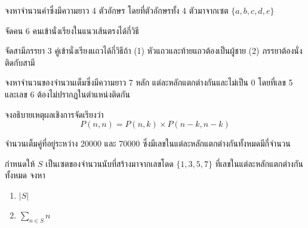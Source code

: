 

\begin{exam}
	จงหาจำนวนคำซึ่งมีความยาว 4 ตัวอักษร โดยที่ตัวอักษรทั้ง 4 ตัวมาจากเซต $ \{a,b,c,d,e\} $
\end{exam}
\begin{exam}
	จัดคน 6 คนเข้านั่งเรียงในแนวเส้นตรงได้กี่วิธี
\end{exam}
\begin{exam}
	จัดสามีภรรยา 3 คู่เข้านั่งเรียงแถวได้กี่วิธีถ้า (1) หัวแถวและท้ายแถวต้องเป็นผู้ชาย (2) ภรรยาต้องนั่งติดกับสามี
\end{exam}
\begin{exam}
	จงหาจำนวนของจำนวนเต็มซึ่งมีความยาว 7 หลัก แต่ละหลักแตกต่างกันและไม่เป็น 0 โดยที่เลข 5 และเลข 6 ต้องไม่ปรากฏในตำแหน่งติดกัน
\end{exam}
\begin{exam}\label{combiPr}
	จงอธิบายเหตุผลเชิงการจัดเรียงว่า $$ P(n,n) = P(n,k)\times P(n-k,n-k) $$
\end{exam}

\begin{exam}
	จำนวนเต็มคู่ที่อยู่ระหว่าง 20000 และ 70000 ซึ่งมีเลขในแต่ละหลักแตกต่างกันทั้งหมดมีกี่จำนวน
\end{exam}
\begin{exam}
	กำหนดให้ $ S $ เป็นเซตของจำนวนนับที่สร้างมาจากเลขโดด $ \{ 1,3,5,7\} $ ที่เลขในแต่ละหลักแตกต่างกันทั้งหมด จงหา
	\begin{enumerate}
		\item $ |S| $
		\item $ \sum_{n\in S} n $
	\end{enumerate}
\end{exam}
